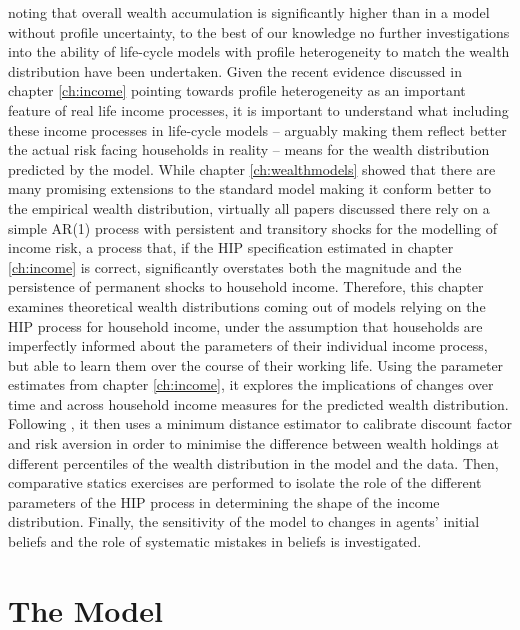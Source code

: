 noting that overall wealth accumulation is significantly higher than in a model
without profile uncertainty, to the best of our knowledge no further investigations
into the ability of life-cycle models with profile heterogeneity to match the 
wealth distribution have been undertaken. Given the recent evidence discussed 
in chapter \ref{ch:income} pointing towards profile heterogeneity as an important
feature of real life income processes, it is important to understand what including
these income processes in life-cycle models -- arguably making them reflect
better the actual risk facing households in reality -- means for the wealth 
distribution predicted by the model. While chapter \ref{ch:wealthmodels} showed
that there are many promising extensions to the standard model making it conform
better to the empirical wealth distribution, virtually all papers discussed there
rely on a simple AR(1) process with persistent and transitory shocks for the 
modelling of income risk, a process that, if the HIP specification estimated 
in chapter \ref{ch:income} is correct, significantly overstates both the magnitude
and the persistence of permanent shocks to household income. Therefore, this 
chapter examines theoretical wealth distributions coming out of models relying
on the HIP process for household income, under the assumption that households 
are imperfectly informed about the parameters of their individual income 
process, but able to learn them over the course of their working life. Using the
parameter estimates from chapter \ref{ch:income}, it explores the implications
of changes over time and across household income measures for the predicted
wealth distribution. Following \citet{HintermaierKoeniger2011}, it then uses 
a minimum distance estimator to calibrate discount factor and risk aversion in
order to minimise the difference between wealth holdings at different percentiles
of the wealth distribution in the model and the data. Then, comparative statics
exercises are performed to isolate the role of the different parameters of the
HIP process in determining the shape of the income distribution. Finally, the 
sensitivity of the model to changes in agents' initial beliefs and the role
of systematic mistakes in beliefs is investigated.


\section{The Model}\label{sec:model}

